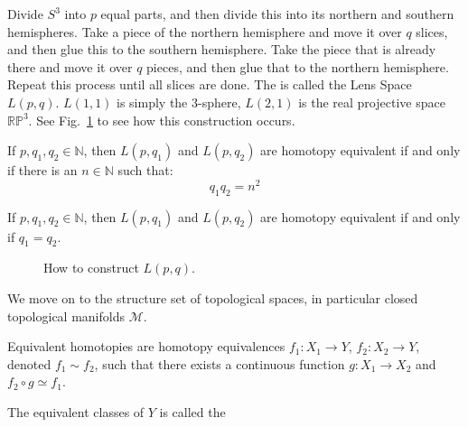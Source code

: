             Divide $S^{3}$ into $p$ equal parts, and then divide
            this into its northern and southern hemispheres.
            Take a piece of the northern hemisphere and move
            it over $q$ slices, and then glue this to the
            southern hemisphere. Take the piece that is already
            there and move it over $q$ pieces, and then glue
            that to the northern hemisphere. Repeat this
            process until all slices are done. The is called
            the Lens Space $L(p,q)$. $L(1,1)$ is simply the
            3-sphere, $L(2,1)$ is the real projective space
            $\mathbb{RP}^{3}$.
            See Fig.~\ref{fig:surgery_theory_lens_space_drawing}
            to see how this construction occurs.
            \begin{theorem}
                If $p,q_{1},q_{2}\in\mathbb{N}$, then $L(p,q_{1})$ and
                $L(p,q_{2})$ are homotopy equivalent if and only if there
                is an $n\in\mathbb{N}$ such that:
                \begin{equation}
                    q_{1}q_{2}=n^{2}
                \end{equation}
            \end{theorem}
            \begin{theorem}
                If $p,q_{1},q_{2}\in\mathbb{N}$, then $L(p,q_{1})$ and
                $L(p,q_{2})$ are homotopy equivalent if and only if
                $q_{1}=q_{2}$.
            \end{theorem}
            \begin{figure}[H]
                \centering
                \captionsetup{type=figure}
                
                \caption{How to construct $L(p,q)$.}
                \label{fig:surgery_theory_lens_space_drawing}
            \end{figure}
            We move on to the structure set of topological spaces,
            in particular closed topological
            manifolds $\mathcal{M}$.
            \begin{definition}
                Equivalent homotopies are homotopy equivalences
                $f_{1}:X_{1}\rightarrow Y$,
                $f_{2}:X_{2}\rightarrow Y$,
                denoted $f_{1}\sim{f_{2}}$, such that there
                exists a continuous function
                $g:X_{1}\rightarrow{X_{2}}$ and
                $f_{2}\circ{g}\simeq{f_{1}}$.
            \end{definition}
            The equivalent classes of $Y$ is called the

